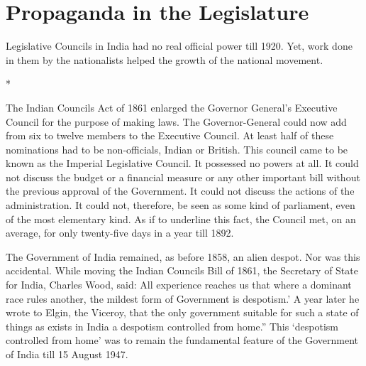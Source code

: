 \chapter{Propaganda in the Legislature}

Legislative Councils in India had no real official power till 1920. Yet, work done in them by the nationalists helped the growth of the national movement.

\begin{center}*\end{center}

The Indian Councils Act of 1861 enlarged the Governor­ General’s Executive Council for the purpose of making laws. The Governor-General could now add from six to twelve members to the Executive Council. At least half of these nominations had to be non-officials, Indian or British. This council came to be known as the Imperial Legislative Council. It possessed no powers at all. It could not discuss the budget or a financial measure or any other important bill without the previous approval of the Government. It could not discuss the actions of the administration. It could not, therefore, be seen as some kind of parliament, even of the most elementary kind. As if to underline this fact, the Council met, on an average, for only twenty-five days in a year till 1892.

The Government of India remained, as before 1858, an alien despot. Nor was this accidental. While moving the Indian Councils Bill of 1861, the Secretary of State for India, Charles Wood, said: All experience reaches us that where a dominant race rules another, the mildest form of Government is despotism.’ A year later he wrote to Elgin, the Viceroy, that the only government suitable for such a state of things as exists in India a despotism controlled from home.” This ‘despotism controlled from home’ was to remain the fundamental feature of the Government of India till 15 August 1947.

